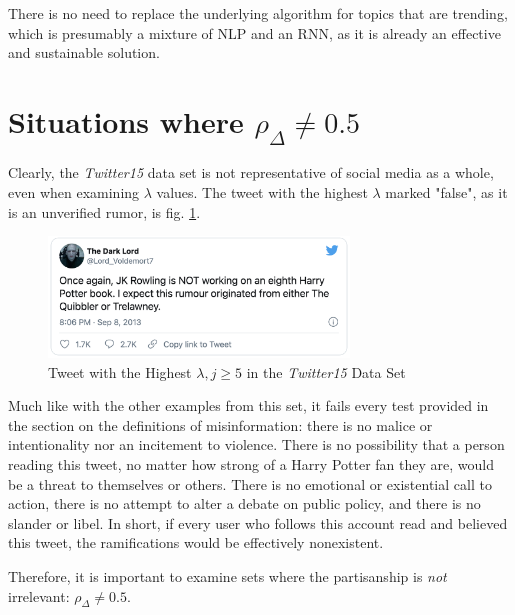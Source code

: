 \documentclass[NETN,manuscript]{stjour-new}
\begin{document}
There is no need to replace the underlying algorithm for topics that are trending, which is presumably a mixture of NLP and an RNN, as it is already an effective and sustainable solution. 



\section{Situations where $\rho_{\Delta} \neq 0.5$} 
Clearly, the \textit{Twitter15} data set is not representative of social media as a whole, even when examining $\lambda$ values. The tweet with the highest $\lambda$ marked "false", as it is an unverified rumor, is fig. \ref{img:Voldemort Tweet}. 
\begin{figure}[htp]
    \centering
    \includegraphics[width=8cm]{voldemort tweet.png}
    \caption{Tweet with the Highest $\lambda, j \geq 5$ in the \textit{Twitter15} Data Set}
    \label{img:Voldemort Tweet}
\end{figure} Much like with the other examples from this set, it fails every test provided in the section on the definitions of misinformation: there is no malice or intentionality nor an incitement to violence. There is no possibility that a person reading this tweet, no matter how strong of a Harry Potter fan they are, would be a threat to themselves or others. There is no emotional or existential call to action, there is no attempt to alter a debate on public policy, and there is no slander or libel. In short, if every user who follows this account read and believed this tweet, the ramifications would be effectively nonexistent. 

Therefore, it is important to examine sets where the partisanship is \textit{not} irrelevant: $\rho_{\Delta} \neq 0.5$. 
\end{document}
